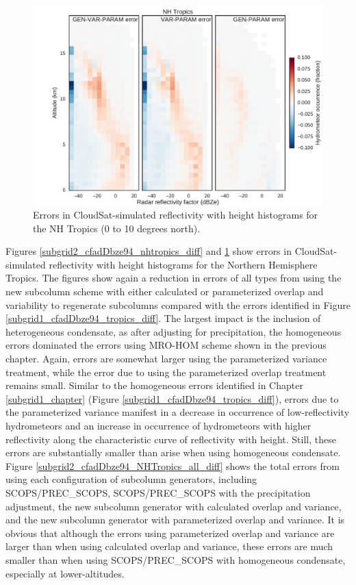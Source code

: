 \begin{figure}
\centering
\includegraphics[width=\columnwidth]{graphics/subgrid2_cfadDbze94_NHTropics_gen-var-param_diff.pdf}
\caption{Errors in CloudSat-simulated reflectivity with height histograms for the NH Tropics (0 to 10 degrees north).}
\label{subgrid2_cfadDbze94_nhtropics_gen-var-param_diff}
\end{figure}

Figures \ref{subgrid2_cfadDbze94_nhtropics_diff} and \ref{subgrid2_cfadDbze94_nhtropics_gen-var-param_diff} show errors in CloudSat-simulated reflectivity with height histograms for the Northern Hemisphere Tropics. The figures show again a reduction in errors of all types from using the new subcolumn scheme with either calculated or parameterized overlap and variability to regenerate subcolumns compared with the errors identified in Figure \ref{subgrid1_cfadDbze94_tropics_diff}. The largest impact is the inclusion of heterogeneous condensate, as after adjusting for precipitation, the homogeneous errors dominated the errors using MRO-HOM scheme shown in the previous chapter. Again, errors are somewhat larger using the parameterized variance treatment, while the error due to using the parameterized overlap treatment remains small. Similar to the homogeneous errors identified in Chapter \ref{subgrid1_chapter} (Figure \ref{subgrid1_cfadDbze94_tropics_diff}), errors due to the parameterized variance manifest in a decrease in occurrence of low-reflectivity hydrometeors and an increase in occurrence of hydrometeors with higher reflectivity along the characteristic curve of reflectivity with height. Still, these errors are substantially smaller than arise when using homogeneous condensate. Figure \ref{subgrid2_cfadDbze94_NHTropics_all_diff} shows the total errors from using each configuration of subcolumn generators, including SCOPS/PREC\_SCOPS, SCOPS/PREC\_SCOPS with the precipitation adjustment, the new subcolumn generator with calculated overlap and variance, and the new subcolumn generator with parameterized overlap and variance. It is obvious that although the errors using parameterized overlap and variance are larger than when using calculated overlap and variance, these errors are much smaller than when using SCOPS/PREC\_SCOPS with homogeneous condensate, especially at lower-altitudes.

